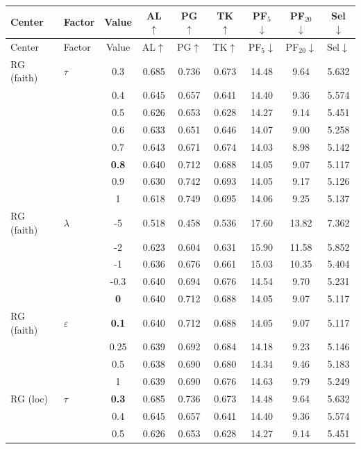 \begin{longtable}{@{}l l c c c c c c c@{}}
\toprule
Center & Factor & Value & AL$\uparrow$ & PG$\uparrow$ & TK$\uparrow$ & PF$_5$$\downarrow$ & PF$_{20}$$\downarrow$ & Sel$\downarrow$ \\
\midrule
\endfirsthead
\toprule
Center & Factor & Value & AL$\uparrow$ & PG$\uparrow$ & TK$\uparrow$ & PF$_5$$\downarrow$ & PF$_{20}$$\downarrow$ & Sel$\downarrow$ \\
\midrule
\endhead
\bottomrule
\endlastfoot
RG (faith) & $\tau$ & 0.3 & 0.685 & 0.736 & 0.673 & 14.48 & 9.64 & 5.632 \\
 &  & 0.4 & 0.645 & 0.657 & 0.641 & 14.40 & 9.36 & 5.574 \\
 &  & 0.5 & 0.626 & 0.653 & 0.628 & 14.27 & 9.14 & 5.451 \\
 &  & 0.6 & 0.633 & 0.651 & 0.646 & 14.07 & 9.00 & 5.258 \\
 &  & 0.7 & 0.643 & 0.671 & 0.674 & 14.03 & 8.98 & 5.142 \\
 &  & \textbf{0.8} & 0.640 & 0.712 & 0.688 & 14.05 & 9.07 & 5.117 \\
 &  & 0.9 & 0.630 & 0.742 & 0.693 & 14.05 & 9.17 & 5.126 \\
 &  & 1 & 0.618 & 0.749 & 0.695 & 14.06 & 9.25 & 5.137 \\
\midrule
RG (faith) & $\lambda$ & {-}5 & 0.518 & 0.458 & 0.536 & 17.60 & 13.82 & 7.362 \\
 &  & {-}2 & 0.623 & 0.604 & 0.631 & 15.90 & 11.58 & 5.852 \\
 &  & {-}1 & 0.636 & 0.676 & 0.661 & 15.03 & 10.35 & 5.404 \\
 &  & {-}0.3 & 0.640 & 0.694 & 0.676 & 14.54 & 9.70 & 5.231 \\
 &  & \textbf{0} & 0.640 & 0.712 & 0.688 & 14.05 & 9.07 & 5.117 \\
\midrule
RG (faith) & $\varepsilon$ & \textbf{0.1} & 0.640 & 0.712 & 0.688 & 14.05 & 9.07 & 5.117 \\
 &  & 0.25 & 0.639 & 0.692 & 0.684 & 14.18 & 9.23 & 5.146 \\
 &  & 0.5 & 0.638 & 0.690 & 0.680 & 14.34 & 9.46 & 5.183 \\
 &  & 1 & 0.639 & 0.690 & 0.676 & 14.63 & 9.79 & 5.249 \\
\midrule
RG (loc) & $\tau$ & \textbf{0.3} & 0.685 & 0.736 & 0.673 & 14.48 & 9.64 & 5.632 \\
 &  & 0.4 & 0.645 & 0.657 & 0.641 & 14.40 & 9.36 & 5.574 \\
 &  & 0.5 & 0.626 & 0.653 & 0.628 & 14.27 & 9.14 & 5.451 \\

\end{longtable}
